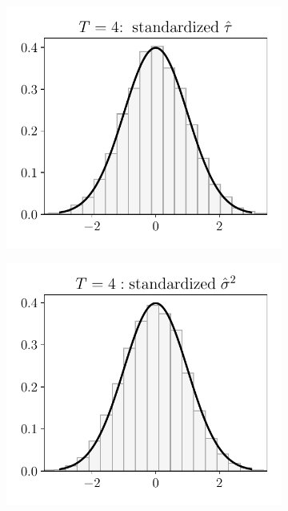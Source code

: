 \begin{figure}[h!]
\begin{subfigure}{0.3\textwidth}
	\end{subfigure}
	\begin{subfigure}{0.3\textwidth}
		\centering
		\includegraphics[width=1\linewidth]{plots/simulation/tau_T_4.pdf}
	\end{subfigure}
	\begin{subfigure}{0.3\textwidth}
		\centering
		\includegraphics[width=1\linewidth]{plots/simulation/sigma_T_4.pdf}

\end{subfigure}
\end{figure}
